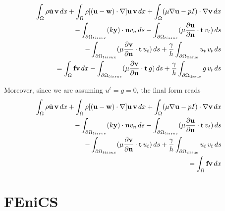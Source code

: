 \documentclass[11pt,a4paper,titlepage]{report}
\begin{document}
\begin{equation}
\begin{split}
\label{eq:nitsche:6}
 \int_{\Omega} \rho \dot{\mathbf{u}} \, \mathbf{v} \, dx
+ \int_{\Omega} \rho [(\mathbf{u - w}) \cdot \nabla] \mathbf{u} \, \mathbf{v} \, dx
+ \int_{\Omega} (\mu \nabla \mathbf{u} - pI) \cdot \nabla \mathbf{v} \, dx \\
- \int_{\partial \Omega_{tissue}} (k \mathbf{y}) \cdot \mathbf{n} v_n \, ds 
- \int_{\partial \Omega_{tissue}} (\mu \frac{\partial \mathbf{u}}{\partial \mathbf{n}} \cdot \mathbf{t} \, v_t) \, ds \\
- \int_{\partial \Omega_{tissue}} (\mu \frac{\partial \mathbf{v}}{\partial \mathbf{n}} \cdot \mathbf{t} \, u_t) \, ds
+ \frac{\gamma}{h} \int_{\partial \Omega_{\rm tissue}} u_t \, v_t \, ds \\
= \int_{\Omega} \mathbf{f} \mathbf{v} \, dx
- \int_{\partial \Omega_{tissue}} (\mu \frac{\partial \mathbf{v}}{\partial \mathbf{n}} \cdot \mathbf{t} \, g) \, ds 
+ \frac{\gamma}{h} \int_{\partial \Omega_{\rm tissue}} g \, v_t \, ds
\end{split}
\end{equation}

Moreover, since we are assuming $u^t = g = 0$, the final form reads
\begin{equation}
\begin{split}
 \int_{\Omega} \rho \dot{\mathbf{u}} \, \mathbf{v} \, dx
+ \int_{\Omega} \rho [(\mathbf{u - w}) \cdot \nabla] \mathbf{u} \, \mathbf{v} \, dx
+ \int_{\Omega} (\mu \nabla \mathbf{u} - pI) \cdot \nabla \mathbf{v} \, dx \\
- \int_{\partial \Omega_{tissue}} (k \mathbf{y}) \cdot \mathbf{n} v_n \, ds 
- \int_{\partial \Omega_{tissue}} (\mu \frac{\partial \mathbf{u}}{\partial \mathbf{n}} \cdot \mathbf{t} \, v_t) \, ds \\
- \int_{\partial \Omega_{tissue}} (\mu \frac{\partial \mathbf{v}}{\partial \mathbf{n}} \cdot \mathbf{t} \, u_t) \, ds 
+ \frac{\gamma}{h} \int_{\partial \Omega_{\rm tissue}} u_t \, v_t \, ds \\
= \int_{\Omega} \mathbf{f} \mathbf{v} \, dx
\end{split}
\end{equation}


\section{FEniCS}
\end{document}
